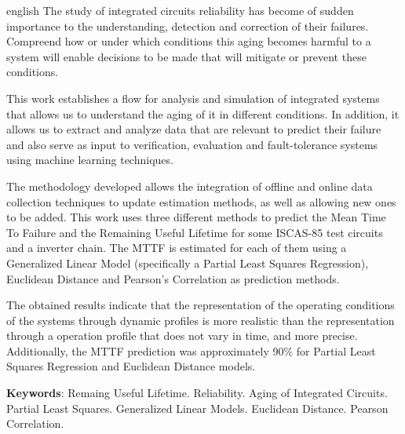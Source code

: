 \begin{resumo}[Abstract]
\begin{otherlanguage*}{english}
The study of integrated circuits reliability has become of sudden importance to the understanding, detection and correction of their failures. Compreend how or under which conditions this aging becomes harmful to a system will enable decisions to be made that will mitigate or prevent these conditions.

This work establishes a flow for analysis and simulation of integrated systems that allows us to understand the aging of it in different conditions. In addition, it allows us to extract and analyze data that are relevant to predict their failure and also serve as input to verification, evaluation and fault-tolerance systems using machine learning techniques.

The methodology developed allows the integration of offline and online data collection techniques to update estimation methods, as well as allowing new ones to be added. This work uses three different methods to predict the Mean Time To Failure and the Remaining Useful Lifetime for some ISCAS-85 test circuits and a inverter chain.
The MTTF is estimated for each of them using a Generalized Linear Model (specifically a Partial Least Squares Regression), Euclidean Distance and Pearson's Correlation as prediction methods.

The obtained results indicate that the representation of the operating conditions of the systems through dynamic profiles is more realistic than the representation through a operation profile that does not vary in time, and more precise. Additionally, the MTTF prediction was approximately 90\% for Partial Least Squares Regression and Euclidean Distance models.

\textbf{Keywords}: Remaing Useful Lifetime. Reliability. Aging of Integrated Circuits. Partial Least Squares. Generalized Linear Models. Euclidean Distance. Pearson Correlation.
\end{otherlanguage*}
\end{resumo}





